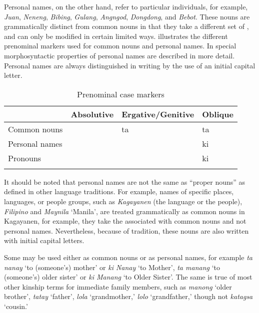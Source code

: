 Personal names, on the other hand, refer to particular individuals, for example, \textit{Juan}, \textit{Neneng}, \textit{Bibing}, \textit{Gulang}, \textit{Angngod}, \textit{Dongdong}, and \textit{Bebot}. These nouns are grammatically distinct from common nouns in that they take a different set of , and can only be modified in certain limited ways.  illustrates the different prenominal markers used for common nouns and personal names. In  special morphosyntactic properties of personal names are described in more detail. Personal names are always distinguished in writing by the use of an initial capital letter.

\begin{table}
\caption{Prenominal case markers}
\label{tab:prenominalcasemarkers}
\begin{tabularx}{\textwidth}{XXll}
\lsptoprule
& Absolutive & Ergative/Genitive & Oblique \\
\midrule
Common nouns & \emptyset{} & ta  & ta  \\
 Personal names & \emptyset{} & \emptyset{} & ki \\
 Pronouns & \emptyset{} & \emptyset{} & ki \\
\lspbottomrule
\end{tabularx}
\end{table}

It should be noted that personal names are not the same as “proper nouns” as defined in other language traditions. For example, names of specific places, languages, or people groups, such as \textit{Kagayanen} (the language or the people), \textit{Filipino} and \textit{Maynila} ‘Manila’,  are treated grammatically as common nouns in Kagayanen, for example, they take the  associated with common nouns and not personal names. Nevertheless, because of tradition, these nouns are also written with initial capital letters.

Some  may be used either as common nouns or as personal names, for example \textit{ta nanay} ‘to (someone’s) mother’ or \textit{ki Nanay} ‘to Mother’, \textit{ta manang} ‘to (someone’s) older sister’ or \textit{ki Manang} ‘to Older Sister’. The same is true of most other kinship terms for immediate family members, such as \textit{manong} ‘older brother’, \textit{tatay} ‘father’, \textit{lola} ‘grandmother,’ \textit{lolo} ‘grandfather,’ though not \textit{katagsa} ‘cousin.’

